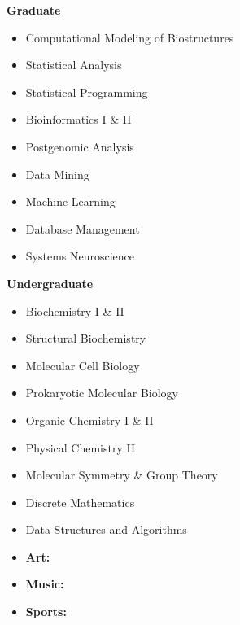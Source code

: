 %
%
%

{
\begin{multicols}{2}

\textbf{Graduate}
\begin{itemize}
	\item Computational Modeling of Biostructures
    \item Statistical Analysis
    \item Statistical Programming
    \item Bioinformatics I \& II
    \item Postgenomic Analysis
    \item Data Mining
    \item Machine Learning
    \item Database Management
    \item Systems Neuroscience
\sectionsep
\end{itemize}

\textbf{Undergraduate}
\begin{itemize}
    \item Biochemistry I \& II
    \item Structural Biochemistry
    \item Molecular Cell Biology
    \item Prokaryotic Molecular Biology
    \item Organic Chemistry I \& II
    \item Physical Chemistry II
    \item Molecular Symmetry \& Group Theory
    \item Discrete Mathematics
    \item Data Structures and Algorithms
\end{itemize}

\end{multicols}
}

\twocolumnsection
{
\begin{skills}
\end{skills}}
{
\vspace{1em}
\begin{itemize}
	\item \textbf{Art:}    
    \item \textbf{Music:}  
    \item \textbf{Sports:}  
\end{itemize}
}